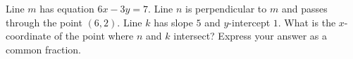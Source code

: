 Line $m$ has equation $6x-3y=7$. Line $n$ is perpendicular to $m$ and passes through the point $(6,2)$. Line $k$ has slope $5$ and $y$-intercept $1$. What is the $x$-coordinate of the point where $n$ and $k$ intersect? Express your answer as a common fraction.
